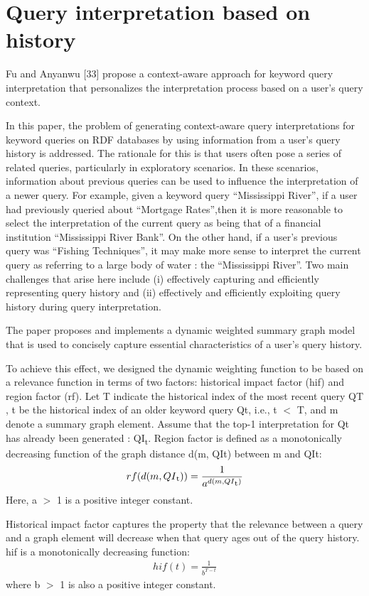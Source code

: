 \section{Query interpretation based on history}
Fu and Anyanwu [33] propose a context-aware approach for keyword query interpretation that personalizes the interpretation process based on a user’s query context.

In this paper, the problem of generating context-aware query interpretations
for keyword queries on RDF databases by using information from
a user’s query history is addressed. The rationale for this is that users often pose a series of
related queries, particularly in exploratory scenarios. In these scenarios, information
about previous queries can be used to influence the interpretation of a
newer query. For example, given a keyword query “Mississippi River”, if a user
had previously queried about “Mortgage Rates”,then it is more reasonable to
select the interpretation of the current query as being that of a financial institution
“Mississippi River Bank”. On the other hand, if a user’s previous query was
“Fishing Techniques”, it may make more sense to interpret the current query
as referring to a large body of water : the “Mississippi River”. Two main challenges
that arise here include (i) effectively capturing and efficiently representing
query history and (ii) effectively and efficiently exploiting query history during
query interpretation.

The paper proposes and implements a dynamic weighted summary graph model that is
used to concisely capture essential characteristics of a user’s query history.

To achieve this effect, we designed the dynamic weighting function to be
based on a relevance function in terms of two factors: historical impact factor
(hif) and region factor (rf).
Let T indicate the historical index of the most recent query QT , t be the
historical index of an older keyword query Qt, i.e., t $<$ T, and m denote a
summary graph element. Assume that the top-1 interpretation for Qt has already
been generated : QI\textsubscript{t}. Region factor is defined as a monotonically decreasing
function of the graph distance d(m, QIt) between m and QIt:
\begin{align}
rf(d(m, QI\textsubscript{t})) = \frac{1} {a^{d(m,QI\textsubscript{t})}}
\end{align}
Here, a $>$ 1 is a positive integer constant.

Historical impact factor captures the
property that the relevance between a query and a graph element will decrease
when that query ages out of the query history. hif is a monotonically decreasing
function: 
\begin{align}
hif(t) = \frac{1}{b^{T-t}}
\end{align}
where b $>$ 1 is also a positive integer constant.



